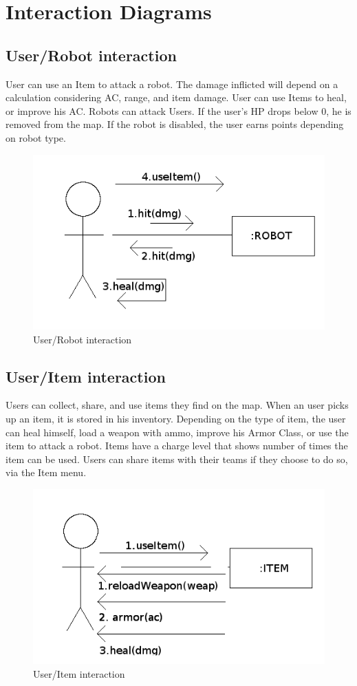 \documentclass{article}
\begin{document}
\section{Interaction Diagrams}
\subsection{User/Robot interaction}
User can use an Item to attack a robot. The damage inflicted will depend on a calculation considering AC, range, and item damage.
User can use Items to heal, or improve his AC.
Robots can attack Users. If the user's HP drops below 0, he is removed from the map.
If the robot is disabled, the user earns points depending on robot type.
\begin{figure}[htb]
\centering
\includegraphics[scale=0.5]{user-robot}
\caption{User/Robot interaction}
\end{figure}
\subsection{User/Item interaction}
Users can collect, share, and use items they find on the map. When an user picks up an item, it is stored in his inventory. Depending on the type of item, the user can heal himself, load a weapon with ammo, improve his Armor Class, or use the item to attack a robot. Items have a charge level that shows number of times the item can be used. Users can share items with their teams if they choose to do so, via the Item menu.
\begin{figure}[htb]
\centering
\includegraphics[scale=0.5]{item}
\caption{User/Item interaction}
\end{figure}
\end{document}
